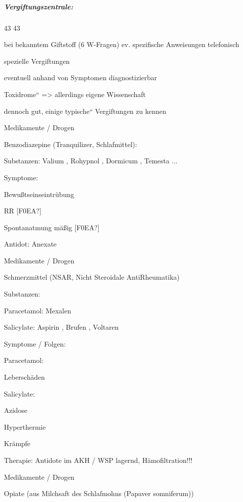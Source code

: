 \subparagraph*{
Vergiftungszentrale:}

{ 43 43}

{\mdseries
bei bekanntem Giftstoff (6 W-Fragen) ev. spezifische Anweisungen
telefonisch}

{\mdseries
spezielle Vergiftungen}

{\mdseries
eventuell anhand von Symptomen  diagnostizierbar}

{\mdseries
{\quotedblbase}Toxidrome{\textquotedblleft} ={\textgreater} allerdings
eigene  Wissenschaft}

{\mdseries
dennoch gut, einige {\quotedblbase}typische{\textquotedblleft} 
Vergiftungen zu kennen}

{\mdseries
Medikamente / Drogen}

{\mdseries
Benzodiazepine  (Tranquilizer,  Schlafmittel):}

{\mdseries
Substanzen: Valium{\textregistered} , Rohypnol{\textregistered} ,
Dormicum{\textregistered} ,  Temesta{\textregistered}  ...}

{\mdseries
Symptome:}

{\mdseries
Bewu{\ss}tseinseintr\"ubung}

{\mdseries
RR [F0EA?]}

{\mdseries
Spontanatmung mä{\ss}ig [F0EA?]}

{\mdseries
Antidot: Anexate{\textregistered} }

{\mdseries
Medikamente / Drogen}

{\mdseries
Schmerzmittel (NSAR, Nicht Steroidale AntiRheumatika)}

{\mdseries
Substanzen: }

{\mdseries
Paracetamol: Mexalen{\textregistered}}

{\mdseries
Salicylate: Aspirin{\textregistered} , Brufen{\textregistered} ,
Voltaren{\textregistered}}

{\mdseries
Symptome / Folgen:}

{\mdseries
Paracetamol: }

{\mdseries
Leberschäden}

{\mdseries
Salicylate: }

{\mdseries
Azidose}

{\mdseries
Hyperthermie}

{\mdseries
Krämpfe}

{\mdseries
Therapie: Antidote im AKH / WSP lagernd,  Hämofiltration!!!}

{\mdseries
Medikamente / Drogen}

{\mdseries
Opiate  (aus Milchsaft des Schlafmohns (Papaver somniferum))}

